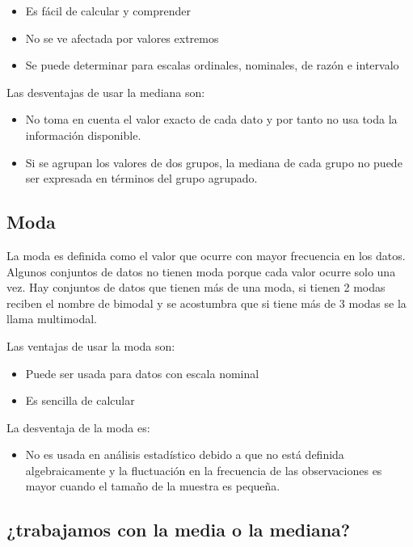 \documentclass[]{book}
\providecommand{\tightlist}{%
  \setlength{\itemsep}{0pt}\setlength{\parskip}{0pt}}
\begin{document}
\begin{itemize}
\tightlist
\item
  Es fácil de calcular y comprender
\item
  No se ve afectada por valores extremos
\item
  Se puede determinar para escalas ordinales, nominales, de razón e
  intervalo
\end{itemize}

Las desventajas de usar la mediana son:

\begin{itemize}
\tightlist
\item
  No toma en cuenta el valor exacto de cada dato y por tanto no usa toda
  la información disponible.
\item
  Si se agrupan los valores de dos grupos, la mediana de cada grupo no
  puede ser expresada en términos del grupo agrupado.
\end{itemize}

\subsection{Moda}\label{moda}

La moda es definida como el valor que ocurre con mayor frecuencia en los
datos. Algunos conjuntos de datos no tienen moda porque cada valor
ocurre solo una vez. Hay conjuntos de datos que tienen más de una moda,
si tienen 2 modas reciben el nombre de bimodal y se acostumbra que si
tiene más de 3 modas se la llama multimodal.

Las ventajas de usar la moda son:

\begin{itemize}
\tightlist
\item
  Puede ser usada para datos con escala nominal
\item
  Es sencilla de calcular
\end{itemize}

La desventaja de la moda es:

\begin{itemize}
\tightlist
\item
  No es usada en análisis estadístico debido a que no está definida
  algebraicamente y la fluctuación en la frecuencia de las observaciones
  es mayor cuando el tamaño de la muestra es pequeña.
\end{itemize}

\subsection{¿trabajamos con la media o la
mediana?}\label{trabajamos-con-la-media-o-la-mediana}
\end{document}
